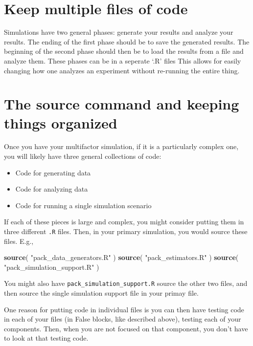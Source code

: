 \documentclass[
]{book}
\newenvironment{Shaded}{\begin{snugshade}}{\end{snugshade}}
\newcommand{\FunctionTok}[1]{\textcolor[rgb]{0.13,0.29,0.53}{\textbf{#1}}}
\newcommand{\NormalTok}[1]{#1}
\newcommand{\StringTok}[1]{\textcolor[rgb]{0.31,0.60,0.02}{#1}}
\providecommand{\tightlist}{%
  \setlength{\itemsep}{0pt}\setlength{\parskip}{0pt}}
\begin{document}
\section{Keep multiple files of code}\label{keep-multiple-files-of-code}

Simulations have two general phases: generate your results and analyze your results.
The ending of the first phase should be to save the generated results.
The beginning of the second phase should then be to load the results from a file and analyze them.
These phases can be in a seperate `.R' files
This allows for easily changing how one analyzes an experiment
without re-running the entire thing.

\section{The source command and keeping things organized}\label{the-source-command-and-keeping-things-organized}

Once you have your multifactor simulation, if it is a particularly complex one, you will likely have three general collections of code:

\begin{itemize}
\tightlist
\item
  Code for generating data
\item
  Code for analyzing data
\item
  Code for running a single simulation scenario
\end{itemize}

If each of these pieces is large and complex, you might consider putting them in three different \texttt{.R} files.
Then, in your primary simulation, you would source these files.
E.g.,

\begin{Shaded}
\begin{Highlighting}[]
\FunctionTok{source}\NormalTok{( }\StringTok{"pack\_data\_generators.R"}\NormalTok{ )}
\FunctionTok{source}\NormalTok{( }\StringTok{"pack\_estimators.R"}\NormalTok{ )}
\FunctionTok{source}\NormalTok{( }\StringTok{"pack\_simulation\_support.R"}\NormalTok{ )}
\end{Highlighting}
\end{Shaded}

You might also have \texttt{pack\_simulation\_support.R} source the other two files, and then source the single simulation support file in your primay file.

One reason for putting code in individual files is you can then have testing code in each of your files (in False blocks, like described above), testing each of your components.
Then, when you are not focused on that component, you don't have to look at that testing code.
\end{document}
